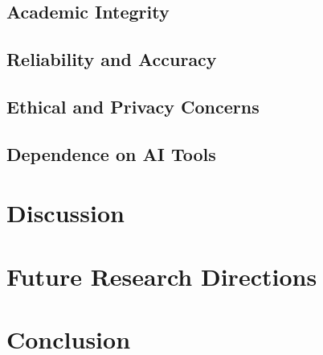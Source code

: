 \documentclass[conference]{IEEEtran}
\begin{document}
\subsection{Academic Integrity}
\subsection{Reliability and Accuracy}
\subsection{Ethical and Privacy Concerns}
\subsection{Dependence on AI Tools}

\section{Discussion}

\section{Future Research Directions}

\section{Conclusion}



\end{document}
